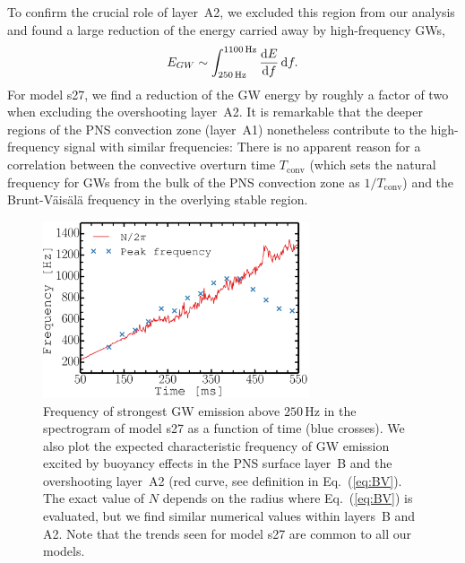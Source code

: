 To confirm the crucial role of layer~A2, we excluded
this region from our analysis and found a large reduction of the
energy carried away by high-frequency GWs,
\begin{equation}
E_{GW} \sim \int_{250 \, \mathrm{Hz}}^{1100\, \mathrm{Hz}} \frac{\mathrm{d} E}{\mathrm{d} f} \, \mathrm{d} f.
\end{equation}
For model s27, we find a reduction of the GW energy
by roughly a factor of two when excluding the overshooting layer~A2. 
It is
remarkable that the deeper regions of the PNS convection zone (layer~A1)
nonetheless contribute to the high-frequency signal with similar
frequencies: There is no apparent reason for a correlation between the
convective overturn time $T_\mathrm{conv}$ (which sets the natural
frequency for GWs from the bulk of the PNS convection zone as
$1/T_\mathrm{conv}$) and the Brunt-V\"{a}is\"{a}l\"{a} frequency in
the overlying stable region.
\begin{figure}
\centering
\includegraphics[width=0.70\textwidth]{./images/paper1/fig7.pdf}
\caption{Frequency of strongest GW emission
above $250 \, \mathrm{Hz}$ in the spectrogram of model s27 as a function of time (blue crosses).
We also plot the expected characteristic frequency of GW emission excited by buoyancy effects
in the PNS surface layer~B and the overshooting layer~A2 (red curve, see definition in Eq.~(\ref{eq:BV}).
The exact value of $N$ depends on the radius where Eq.~(\ref{eq:BV}) is evaluated, 
but we find similar numerical values within layers~B and A2. Note that the trends seen for model s27 are common to all our models.
\label{fig:fpeak}}
\end{figure}

